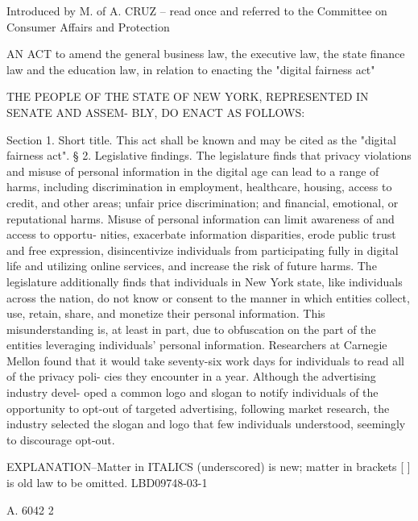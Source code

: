 Introduced  by  M. of A. CRUZ -- read once and referred to the Committee
   on Consumer Affairs and Protection
 
 AN ACT to amend the general business law, the executive law,  the  state
   finance  law  and  the  education  law,  in  relation  to enacting the
   "digital fairness act"

   THE PEOPLE OF THE STATE OF NEW YORK, REPRESENTED IN SENATE AND  ASSEM-
 BLY, DO ENACT AS FOLLOWS:
 
   Section  1.  Short  title. This act shall be known and may be cited as
 the "digital fairness act".
   §  2.  Legislative  findings.  The  legislature  finds  that   privacy
 violations  and  misuse  of  personal information in the digital age can
 lead to a  range  of  harms,  including  discrimination  in  employment,
 healthcare,  housing,  access  to  credit, and other areas; unfair price
 discrimination; and financial, emotional, or reputational harms.  Misuse
 of  personal  information  can limit awareness of and access to opportu-
 nities, exacerbate information disparities, erode public trust and  free
 expression,  disincentivize  individuals  from  participating  fully  in
 digital life and utilizing online services, and  increase  the  risk  of
 future harms.
   The legislature additionally finds that individuals in New York state,
 like individuals across the nation, do not know or consent to the manner
 in  which  entities  collect,  use,  retain,  share,  and monetize their
 personal information. This misunderstanding is, at least in part, due to
 obfuscation on the part of the entities leveraging individuals' personal
 information. Researchers at Carnegie Mellon found  that  it  would  take
 seventy-six  work  days for individuals to read all of the privacy poli-
 cies they encounter in a year. Although the advertising industry  devel-
 oped  a  common logo and slogan to notify individuals of the opportunity
 to opt-out of  targeted  advertising,  following  market  research,  the
 industry  selected  the slogan and logo that few individuals understood,
 seemingly to discourage opt-out.

  EXPLANATION--Matter in ITALICS (underscored) is new; matter in brackets
                       [ ] is old law to be omitted.
                                                            LBD09748-03-1

 A. 6042                             2
 
